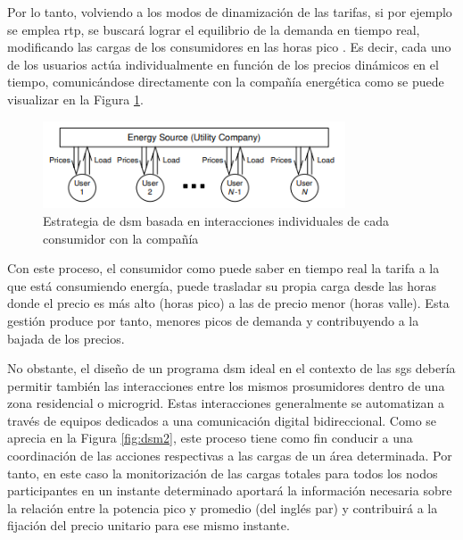 \vspace{3mm}

Por lo tanto, volviendo a los modos de dinamización de las tarifas, si por ejemplo se emplea \gls{rtp}, se buscará lograr el equilibrio de la demanda en tiempo real, modificando las cargas de los consumidores en las horas pico \cite{rtp}. Es decir, cada uno de los usuarios actúa individualmente en función de los precios dinámicos en el tiempo, comunicándose directamente con la compañía energética como se puede visualizar en la Figura \ref{fig:dsm1}.

\vspace{3mm}

\begin{figure}[h!]
  \centering
  \includegraphics[width=0.8\textwidth]{img/teoria/dsm1.png}
  \caption{Estrategia de \acrshort{dsm} basada en interacciones individuales de cada consumidor con la compañía \cite{pricing}}
  \label{fig:dsm1}
\end{figure}

\vspace{3mm}

Con este proceso, el consumidor como puede saber en tiempo real la tarifa a la que está consumiendo energía, puede trasladar su propia carga desde las horas donde el precio es más alto (horas pico) a las de precio menor (horas valle). Esta gestión produce por tanto, menores picos de demanda y contribuyendo a la bajada de los precios. \cite{dsm} \cite{pricing}

\vspace{3mm}

No obstante, el diseño de un programa \gls{dsm} ideal en el contexto de las \gls{sg}s debería permitir también las interacciones entre los mismos prosumidores dentro de una zona residencial o microgrid. Estas interacciones generalmente se automatizan a través de equipos dedicados a una comunicación digital bidireccional. Como se aprecia en la Figura \ref{fig:dsm2}, este proceso tiene como fin conducir a una coordinación de las acciones respectivas a las cargas de un área determinada. Por tanto, en este caso la monitorización de las cargas totales para todos los nodos participantes en un instante determinado aportará la información necesaria sobre la relación entre la potencia pico y promedio (del inglés \gls{par}) y contribuirá a la fijación del precio unitario para ese mismo instante. \cite{pricing}

